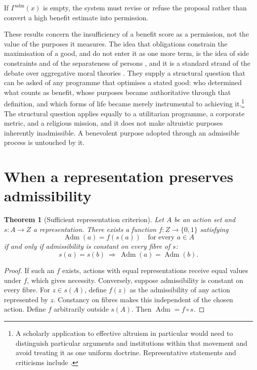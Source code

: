 \documentclass[11pt]{article}
\newtheorem{theorem}{Theorem}
\theoremstyle{definition}
\theoremstyle{remark}
\newcommand{\Adm}{\operatorname{Adm}}
\begin{document}
If $\Gamma^{\mathrm{adm}}(x)$ is empty, the system must revise or refuse the proposal rather than convert a high benefit estimate into permission.

These results concern the insufficiency of a benefit score as a permission, not the value of the purposes it measures. The idea that obligations constrain the maximisation of a good, and do not enter it as one more term, is the idea of side constraints \cite{nozick1974} and of the separateness of persons \cite{rawls1971}, and it is a standard strand of the debate over aggregative moral theories \cite{sen1982}. They supply a structural question that can be asked of any programme that optimises a stated good: who determined what counts as benefit, whose purposes became authoritative through that definition, and which forms of life became merely instrumental to achieving it.\footnote{A scholarly application to effective altruism in particular would need to distinguish particular arguments and institutions within that movement and avoid treating it as one uniform doctrine. Representative statements and criticisms include \cite{singer1972,macaskill2015,srinivasan2015,crary2021}.} The structural question applies equally to a utilitarian programme, a corporate metric, and a religious mission, and it does not make altruistic purposes inherently inadmissible. A benevolent purpose adopted through an admissible process is untouched by it.

\section{When a representation preserves admissibility}

\begin{theorem}[Sufficient representation criterion]\label{thm:repr}
Let $A$ be an action set and $s:A\to Z$ a representation. There exists a function $f:Z\to\{0,1\}$ satisfying
\[
\Adm(a)=f(s(a))\quad\text{for every }a\in A
\]
if and only if admissibility is constant on every fibre of $s$:
\[
s(a)=s(b)\ \Longrightarrow\ \Adm(a)=\Adm(b).
\]
\end{theorem}
\begin{proof}
If such an $f$ exists, actions with equal representations receive equal values under $f$, which gives necessity. Conversely, suppose admissibility is constant on every fibre. For $z\in s(A)$, define $f(z)$ as the admissibility of any action represented by $z$. Constancy on fibres makes this independent of the chosen action. Define $f$ arbitrarily outside $s(A)$. Then $\Adm=f\circ s$. \qedhere
\end{proof}
\end{document}
